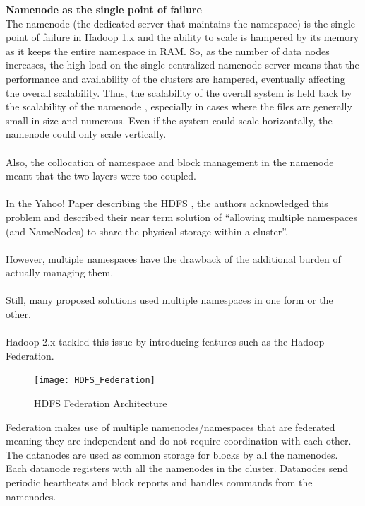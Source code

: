 \documentclass[a4paper,12pt,oneside]{report}
\begin{document}
\textbf{Namenode as the single point of failure}\\
The namenode (the dedicated server that maintains the namespace) is the single point of failure in Hadoop 1.x 
and the ability to scale is hampered by its memory as it keeps the entire namespace in RAM. 
So, as the number of data nodes increases, the high load on the single centralized namenode server means 
that the performance and availability of the clusters are hampered, eventually affecting the overall scalability. 
Thus, the scalability of the overall system is held back by the scalability of the namenode \cite{Shvachko2010}, especially in 
cases where the files are generally small in size and numerous. Even if the system could scale horizontally, the 
namenode could only scale vertically.\\ 
\\
Also, the collocation of namespace and block management in the namenode meant that the two layers were too coupled.\\ 
\\
In the Yahoo! Paper describing the HDFS \cite{Shvachko2010b}, the authors acknowledged this problem and described their near term 
solution of “allowing multiple namespaces (and NameNodes) to share the physical storage within a cluster”.\\
\\
However, multiple namespaces have the drawback of the additional burden of actually managing them.\\
\\
Still, many proposed solutions used multiple namespaces in one form or the other. \cite{Singh2012}\\
\\
Hadoop 2.x tackled this issue by introducing features such as the Hadoop Federation.

\begin{figure}[h!]
        \centering
        \texttt{[image: HDFS\_Federation]}
        \caption{HDFS Federation Architecture}
\end{figure}

Federation makes use of multiple namenodes/namespaces that are federated meaning they are independent and do not 
require coordination with each other. The datanodes are used as common storage for blocks by all the namenodes. 
Each datanode registers with all the namenodes in the cluster. Datanodes send periodic heartbeats and block reports 
and handles commands from the namenodes.\cite{Suresh2011}
\end{document}

